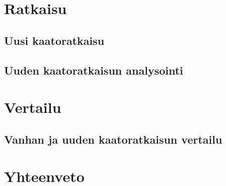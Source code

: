 \documentclass[finnish, numeric]{tauthesis}  %
\begin{document}
\chapter{Ratkaisu}
\label{ch:ratkaisu}

\section{Uusi kaatoratkaisu}
\label{ch:uusi_kaato}


\section{Uuden kaatoratkaisun analysointi}
\label{ch:uuden_analysointi}


\chapter{Vertailu}
\label{ch:vertailu}

\section{Vanhan ja uuden kaatoratkaisun vertailu}
\label{ch:vanhan_ja_uuden_vertailu}


\chapter{Yhteenveto}
\label{ch:yhteenveto}



\printbibliography[heading=bibintoc]



\end{document}
